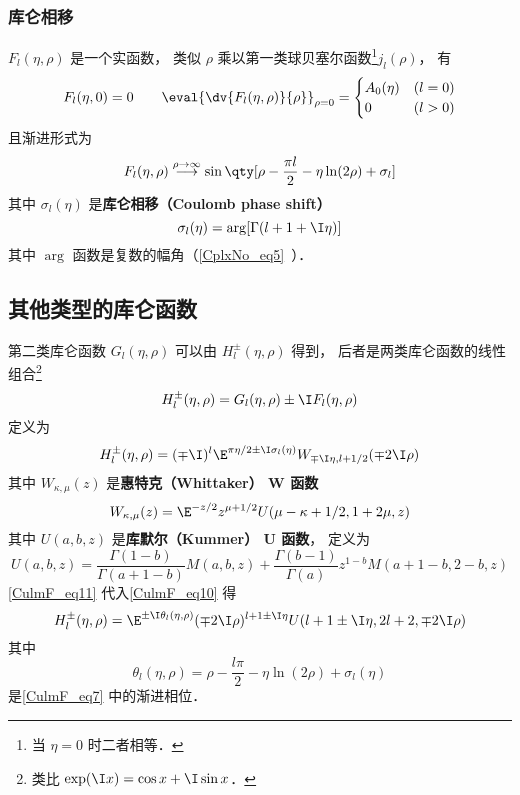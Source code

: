\subsubsection{库仑相移}
$F_l(\eta, \rho)$ 是一个实函数， 类似 $\rho$ 乘以第一类球贝塞尔函数\footnote{当 $\eta = 0$ 时二者相等．}$j_l(\rho)$， 有
\begin{equation}
F_l(\eta, 0) = 0 \qquad \eval{\dv{F_l(\eta, \rho)}{\rho}}_{\rho=0} = 
\begin{cases}
A_0(\eta) &(l = 0)\\
0     &(l > 0)
\end{cases}
\end{equation}
且渐进形式为
\begin{equation}\label{CulmF_eq7}
F_l(\eta, \rho) \overset{\rho\to \infty}{\longrightarrow} \sin\qty[\rho - \frac{\pi l}{2} - \eta\ln(2\rho) + \sigma_l]
\end{equation}
其中 $\sigma_l(\eta)$ 是\textbf{库仑相移（Coulomb phase shift）}
\begin{equation}\label{CulmF_eq8}
\sigma_l(\eta) = \arg[\Gamma(l+1+\I\eta)]
\end{equation}
其中 $\arg$ 函数是复数的幅角（\autoref{CplxNo_eq5}~）．

\subsection{其他类型的库仑函数}

第二类库仑函数 $G_l(\eta, \rho)$ 可以由 $H_l^\pm(\eta, \rho)$ 得到， 后者是两类库仑函数的线性组合\footnote{类比 $\exp(\I x) = \cos x + \I\sin x$．}
\begin{equation}
H_l^\pm(\eta, \rho) = G_l(\eta, \rho) \pm \I F_l(\eta, \rho)
\end{equation}	
定义为
\begin{equation}\label{CulmF_eq10}
H_l^\pm(\eta, \rho) = (\mp\I)^l \E^{\pi\eta/2 \pm \I \sigma_l(\eta)} W_{\mp\I\eta, l + 1/2}(\mp 2\I\rho)
\end{equation}
其中 $W_{\kappa, \mu}(z)$ 是\textbf{惠特克（Whittaker） W 函数}
\begin{equation}\label{CulmF_eq11}
W_{\kappa, \mu}(z) = \E^{-z/2} z^{\mu + 1/2} U(\mu - \kappa + 1/2, 1 + 2\mu, z)
\end{equation}
其中 $U(a, b, z)$ 是\textbf{库默尔（Kummer） U 函数}， 定义为
\begin{equation}
U(a, b, z) = \frac{\Gamma(1 - b)}{\Gamma(a + 1 - b)} M(a, b, z) + \frac{\Gamma(b - 1)}{\Gamma(a)} z^{1 - b} M(a + 1 - b, 2 - b, z)
\end{equation}
\autoref{CulmF_eq11} 代入\autoref{CulmF_eq10} 得
\begin{equation}
H_l^\pm(\eta, \rho) = \E^{\pm\I\theta_l(\eta, \rho)}(\mp 2\I\rho)^{l + 1 \pm\I\eta} U(l + 1 \pm \I\eta, 2l + 2, \mp2\I\rho)
\end{equation}
其中
\begin{equation}
\theta_l(\eta, \rho) = \rho - \frac{l\pi}{2} - \eta\ln(2\rho) + \sigma_l(\eta)
\end{equation}
是\autoref{CulmF_eq7} 中的渐进相位．

